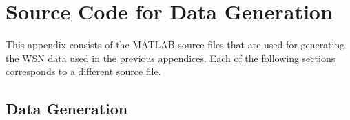 \documentclass[12pt]{uthesis-v12}  %
\begin{document}


\appendix

\chapter{Source Code for Data Generation}

This appendix consists of the MATLAB source files that are used for generating the WSN data used in the previous appendices. Each of the following sections corresponds to a different source file.

\section{Data Generation}
\end{document}
